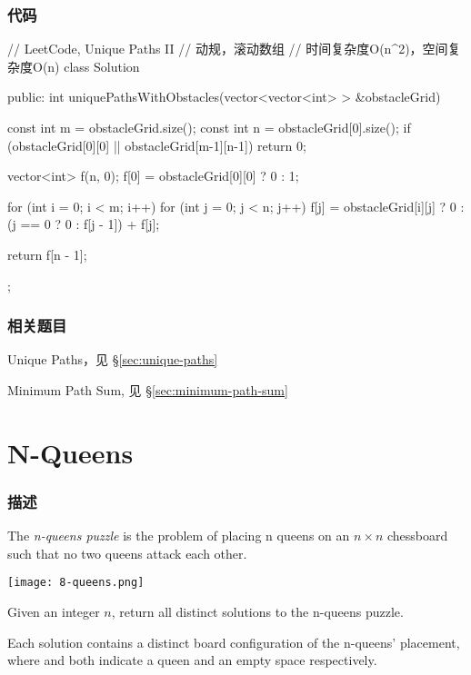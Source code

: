 \subsubsection{代码}
\begin{Code}
// LeetCode, Unique Paths II
// 动规，滚动数组
// 时间复杂度O(n^2)，空间复杂度O(n)
class Solution {
public:
    int uniquePathsWithObstacles(vector<vector<int> > &obstacleGrid) {
        const int m = obstacleGrid.size();
        const int n = obstacleGrid[0].size();
        if (obstacleGrid[0][0] || obstacleGrid[m-1][n-1]) return 0;

        vector<int> f(n, 0);
        f[0] = obstacleGrid[0][0] ? 0 : 1;

        for (int i = 0; i < m; i++)
            for (int j = 0; j < n; j++)
                f[j] = obstacleGrid[i][j] ? 0 : (j == 0 ? 0 : f[j - 1]) + f[j];

        return f[n - 1];
    }
};
\end{Code}


\subsubsection{相关题目}
\begindot
\item Unique Paths，见 \S \ref{sec:unique-paths}
\item Minimum Path Sum, 见 \S \ref{sec:minimum-path-sum}
\myenddot


\section{N-Queens} %
\label{sec:n-queens}


\subsubsection{描述}
The \emph{n-queens puzzle} is the problem of placing n queens on an $n \times n$ chessboard such that no two queens attack each other.

\begin{center}
\texttt{[image: 8-queens.png]}\\
\label{fig:8-queens}
\end{center}

Given an integer $n$, return all distinct solutions to the n-queens puzzle.

Each solution contains a distinct board configuration of the n-queens' placement, where  and  both indicate a queen and an empty space respectively.

